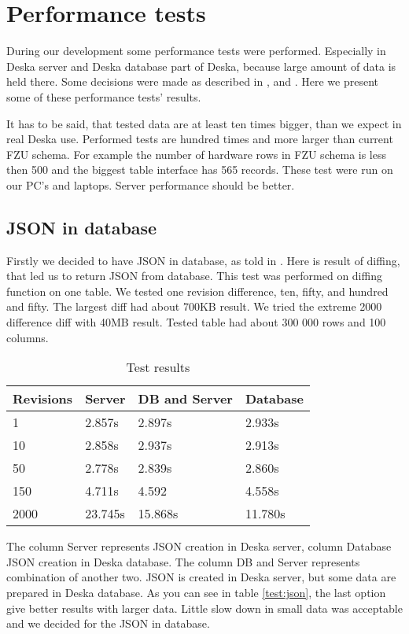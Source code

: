 \documentclass[deska]{subfiles}
\begin{document}
\section{Performance tests}
\label{sec:performance}

During our development some performance tests were performed. Especially in Deska server and Deska database
part of Deska, because large amount of data is held there. Some decisions were made as described in
,  and .
Here we present some of these performance tests' results.

It has to be said, that tested data are at least ten times bigger, than we
expect in real Deska use. Performed tests are hundred times and more larger
than current FZU schema.
For example the number of hardware rows in FZU schema is less then 500 
and the biggest table interface has 565 records.
These test were run on our PC's and laptops. Server performance should be better.

\subsection{JSON in database}
\label{sec:test-json}
Firstly we decided to have JSON in database, as told in .
Here is result of diffing, that led us to
return JSON from database.
This test was performed on diffing function on one table.
We tested one revision difference, ten, fifty, and hundred and fifty.
The largest diff had about 700KB result.
We tried the extreme 2000 difference diff with 40MB result.
Tested table had about 300 000 rows and 100 columns.

\label{test:json}
\begin{longtable}{ l | l | l | l}
\caption{Test results} \\
Revisions & Server & DB and Server & Database \\
\hline
\endhead
1 & 2.857s & 2.897s & 2.933s \\
10 & 2.858s & 2.937s & 2.913s \\
50 & 2.778s & 2.839s & 2.860s \\
150 & 4.711s & 4.592 & 4.558s \\
2000 & 23.745s & 15.868s & 11.780s \\
\end{longtable}

The column Server represents JSON creation in Deska server, column Database JSON creation in
Deska database. The column DB and Server represents combination of another two. JSON is created
in Deska server, but some data are prepared in Deska database.
As you can see in table \ref{test:json}, the last option give better results with larger data.
Little slow down in small data was acceptable and we decided for the JSON in database.
\end{document}
